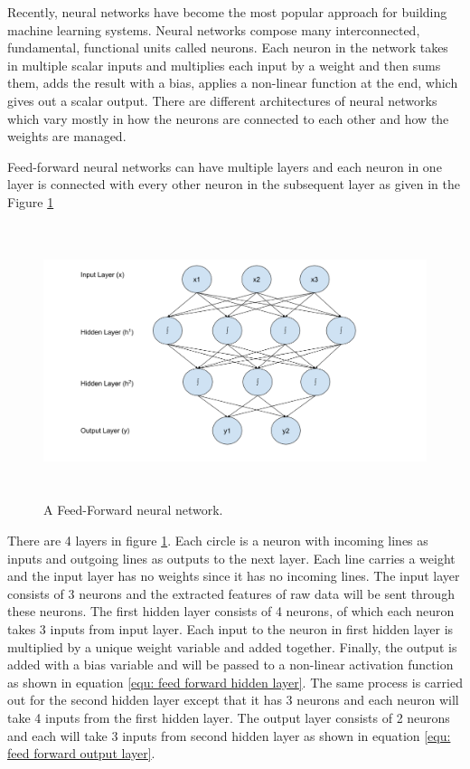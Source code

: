 \documentclass[a4paper, 11pt]{article}
\begin{document}
Recently, neural networks have become the most popular approach for building machine learning systems. Neural networks compose many interconnected, fundamental, functional units called neurons. Each neuron in the network takes in multiple scalar inputs and multiplies each input by a weight and then sums them, adds the result with a bias, applies a non-linear function at the end, which gives out a scalar output. There are different architectures of neural networks which vary mostly in how the neurons are connected to each other and how the weights are managed. 

Feed-forward neural networks \parencite{Svozil1997} can have multiple layers and each neuron in one layer is connected with every other neuron in the subsequent layer as given in the Figure \ref{fig:Feed forward neural network}

\begin{figure}[htpb]
    \centering
    \includegraphics[width=\textwidth,height=8cm,keepaspectratio=true]
    {feed-forward-neural-network.png}
    \caption{
        A Feed-Forward neural network.
    }
    \label{fig:Feed forward neural network}
\end{figure}

There are 4 layers in figure \ref{fig:Feed forward neural network}. Each circle is a neuron with incoming lines as inputs and outgoing lines as outputs to the next layer. Each line carries a weight and the input layer has no weights since it has no incoming lines. The input layer consists of 3 neurons and the extracted features of raw data will be sent through these neurons. The first hidden layer consists of 4 neurons, of which each neuron takes 3 inputs from input layer. Each input to the neuron in first hidden layer is multiplied by a unique weight variable and added together.  Finally, the output is added with a bias variable and will be passed to a non-linear activation function as shown in equation \ref{equ: feed forward hidden layer}. The same process is carried out for the second hidden layer except that it has 3 neurons and each neuron will take 4 inputs from the first hidden layer. The output layer consists of 2 neurons and each will take 3 inputs from second hidden layer as shown in equation \ref{equ: feed forward output layer}.
\end{document}
